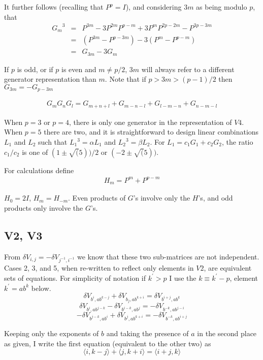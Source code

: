 \documentclass{revtex4-1}
\begin{document}
It further follows (recalling that $P^p=I$), and considering $3m$ as being modulo $p$, that
\begin{eqnarray}
{G_m}^3 & =&  P^{3m} - 3 P^{2m} P^{p-m} + 3 P^m P^{2p-2m} - P^{3p-3m} \\
&=& (P^{3m} - P^{p-3m}) - 3 (P^m - P^{p-m}) \\
&=& G_{3m} - 3 G_m
\end{eqnarray}

If $p$ is odd, or if $p$ is even and $m\neq p/2$, $3m$ will always refer to a different generator representation
than $m$.  Note that if $p>3m>(p-1)/2$ then $G_{3m} = -G_{p-3m}$

\begin{eqnarray}
G_m G_n G_l = G_{m+n+l} + G_{m-n-l} + G_{l-m-n} + G_{n-m-l}
\end{eqnarray}

When $p=3$ or $p=4$, there is only one generator in the representation of $V4$.  When
$p=5$ there are two, and it is straightforward to design linear combinations $L_1$ and
$L_2$ such that ${L_1}^3 = \alpha L_1$ and ${L_2}^3 = \beta L_2$.  For $L_1 = c_1 G_1 
+ c_2 G_2$, the ratio  $c_1/c_2$ is one of $(1 \pm \sqrt(5))/2$ or $(-2 \pm \sqrt(5))$.

For calculations define
\begin{eqnarray}
H_m = P^m + P^{p-m}
\end{eqnarray}

\par $H_0 = 2 I$, $H_m=H_{-m}$.  Even products of $G$'s involve  only the $H$'s, and odd products only
involve the $G$'s.

\subsection{V2, V3}
From $\delta V_{i,j} = - \delta V_{j^{-1},i^{-1}}$ we know that these two sub-matrices
are not independent.  Cases 2, 3, and 5, when re-written to reflect only elements in $V2$,
are equivalent sets of equations.  For simplicity of notation if $k^{\prime}>p$ I use the 
$k \equiv k^{\prime} -p$, 
element $k^{\prime} = a b^k$ below.
$$\delta V_{b^i,ab^{k-j}} + \delta V_{b_j,ab^{k+i}} = \delta V_{b^{i+j},ab^k}$$
$$\delta V_{b^i,ab^{j-k}} - \delta V_{b^{i-k},ab^j} = - \delta V_{b^{-k}, ab^{j-i}}$$
$$-\delta V_{b^{j-k},ab^i} + \delta V_{b^j, ab^{k+i}} = -\delta V_{b^{-k},ab^{i+j}}$$

Keeping only the exponents of $b$ and taking the presence of $a$ in the second
place as given, I write the first equation (equivalent to the other two) as
\begin{equation} \label{eqn:case235}
\langle i, k-j\rangle + \langle j, k+i\rangle = \langle i+j, k\rangle
\end{equation}
\end{document}
